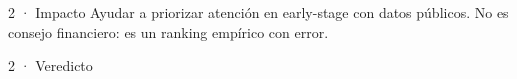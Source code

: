 \begin{frame}{2 · Impacto}
  Ayudar a priorizar atención en early-stage con datos públicos. No es consejo financiero: es un ranking empírico con error.
\end{frame}

\begin{frame}{2 · Veredicto}
\end{frame}
